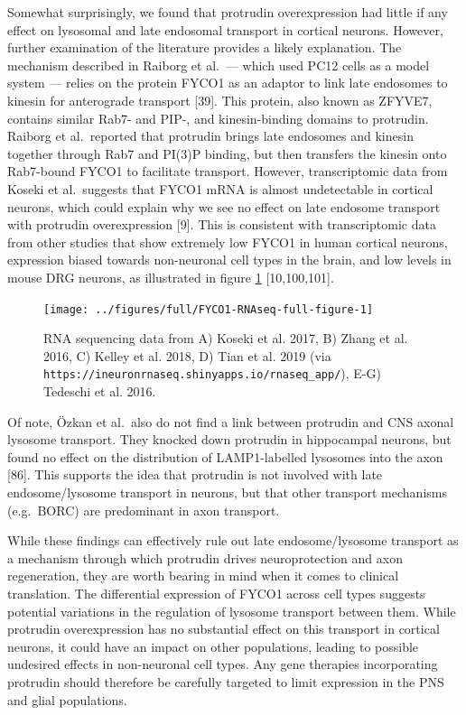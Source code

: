 \documentclass[
  12pt,
  a4paper,
]{book}
\begin{document}
Somewhat surprisingly, we found that protrudin overexpression had little if any effect on lysosomal and late endosomal transport in cortical neurons. However, further examination of the literature provides a likely explanation. The mechanism described in Raiborg et al.~--- which used PC12 cells as a model system --- relies on the protein FYCO1 as an adaptor to link late endosomes to kinesin for anterograde transport {[}39{]}. This protein, also known as ZFYVE7, contains similar Rab7- and PIP-, and kinesin-binding domains to protrudin. Raiborg et al.~reported that protrudin brings late endosomes and kinesin together through Rab7 and PI(3)P binding, but then transfers the kinesin onto Rab7-bound FYCO1 to facilitate transport. However, transcriptomic data from Koseki et al.~suggests that FYCO1 mRNA is almost undetectable in cortical neurons, which could explain why we see no effect on late endosome transport with protrudin overexpression {[}9{]}. This is consistent with transcriptomic data from other studies that show extremely low FYCO1 in human cortical neurons, expression biased towards non-neuronal cell types in the brain, and low levels in mouse DRG neurons, as illustrated in figure \ref{fig:FYCO1-RNAseq-full-figure} {[}10,100,101{]}.

\begin{figure}
\texttt{[image: ../figures/full/FYCO1-RNAseq-full-figure-1]} \caption[FYCO1 transcriptome comparisons]{RNA sequencing data from A) Koseki et al. 2017, B) Zhang et al. 2016, C) Kelley et al. 2018, D) Tian et al. 2019 (via \texttt{https://ineuronrnaseq.shinyapps.io/rnaseq\_app/}), E-G) Tedeschi et al. 2016.}\label{fig:FYCO1-RNAseq-full-figure}
\end{figure}

Of note, Özkan et al.~also do not find a link between protrudin and CNS axonal lysosome transport. They knocked down protrudin in hippocampal neurons, but found no effect on the distribution of LAMP1-labelled lysosomes into the axon {[}86{]}. This supports the idea that protrudin is not involved with late endosome/lysosome transport in neurons, but that other transport mechanisms (e.g.~BORC) are predominant in axon transport.

While these findings can effectively rule out late endosome/lysosome transport as a mechanism through which protrudin drives neuroprotection and axon regeneration, they are worth bearing in mind when it comes to clinical translation. The differential expression of FYCO1 across cell types suggests potential variations in the regulation of lysosome transport between them. While protrudin overexpression has no substantial effect on this transport in cortical neurons, it could have an impact on other populations, leading to possible undesired effects in non-neuronal cell types. Any gene therapies incorporating protrudin should therefore be carefully targeted to limit expression in the PNS and glial populations.
\end{document}
